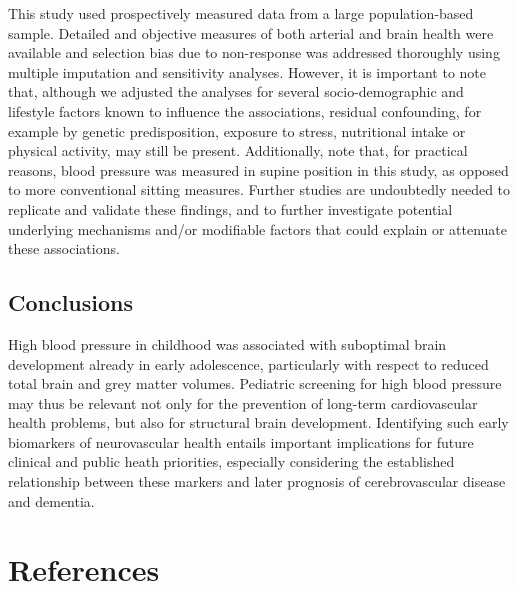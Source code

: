 \documentclass[
  letterpaper,
  DIV=11,
  numbers=noendperiod]{scrreport}
\begin{document}
This study used prospectively measured data from a large
population-based sample. Detailed and objective measures of both
arterial and brain health were available and selection bias due to
non-response was addressed thoroughly using multiple imputation and
sensitivity analyses. However, it is important to note that, although we
adjusted the analyses for several socio-demographic and lifestyle
factors known to influence the associations, residual confounding, for
example by genetic predisposition, exposure to stress, nutritional
intake or physical activity, may still be present. Additionally, note
that, for practical reasons, blood pressure was measured in supine
position in this study, as opposed to more conventional sitting
measures. Further studies are undoubtedly needed to replicate and
validate these findings, and to further investigate potential underlying
mechanisms and/or modifiable factors that could explain or attenuate
these associations.

\subsection{Conclusions}\label{conclusions-1}

High blood pressure in childhood was associated with suboptimal brain
development already in early adolescence, particularly with respect to
reduced total brain and grey matter volumes. Pediatric screening for
high blood pressure may thus be relevant not only for the prevention of
long-term cardiovascular health problems, but also for structural brain
development. Identifying such early biomarkers of neurovascular health
entails important implications for future clinical and public heath
priorities, especially considering the established relationship between
these markers and later prognosis of cerebrovascular disease and
dementia.

\section*{References}\label{references-6}

\end{document}
